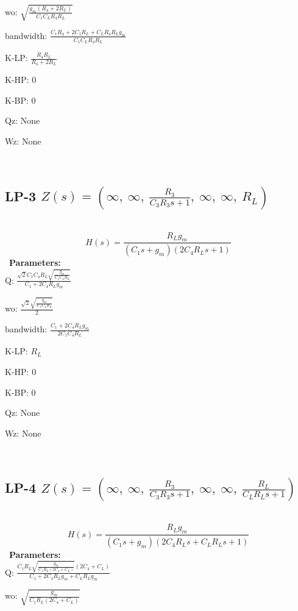 \documentclass{article}
\begin{document}
wo: $\sqrt{\frac{g_{m} \left(R_{4} + 2 R_{L}\right)}{C_{1} C_{L} R_{4} R_{L}}}$\ 

bandwidth: $\frac{C_{1} R_{4} + 2 C_{1} R_{L} + C_{L} R_{4} R_{L} g_{m}}{C_{1} C_{L} R_{4} R_{L}}$\ 

K-LP: $\frac{R_{4} R_{L}}{R_{4} + 2 R_{L}}$\ 

K-HP: $0$\ 

K-BP: $0$\ 

Qz: $\text{None}$\ 

Wz: $\text{None}$\ 

\ 

\subsection{LP-3 $Z(s) = \left( \infty, \  \infty, \  \frac{R_{3}}{C_{3} R_{3} s + 1}, \  \infty, \  \infty, \  R_{L}\right)$ } \ 
\textbf{\[H(s) = \frac{R_{L} g_{m}}{\left(C_{1} s + g_{m}\right) \left(2 C_{4} R_{L} s + 1\right)}\] } \ 
\textbf{Parameters:}\\ 

Q: $\frac{\sqrt{2} C_{1} C_{4} R_{L} \sqrt{\frac{g_{m}}{C_{1} C_{4} R_{L}}}}{C_{1} + 2 C_{4} R_{L} g_{m}}$\ 

wo: $\frac{\sqrt{2} \sqrt{\frac{g_{m}}{C_{1} C_{4} R_{L}}}}{2}$\ 

bandwidth: $\frac{C_{1} + 2 C_{4} R_{L} g_{m}}{2 C_{1} C_{4} R_{L}}$\ 

K-LP: $R_{L}$\ 

K-HP: $0$\ 

K-BP: $0$\ 

Qz: $\text{None}$\ 

Wz: $\text{None}$\ 

\ 

\subsection{LP-4 $Z(s) = \left( \infty, \  \infty, \  \frac{R_{3}}{C_{3} R_{3} s + 1}, \  \infty, \  \infty, \  \frac{R_{L}}{C_{L} R_{L} s + 1}\right)$ } \ 
\textbf{\[H(s) = \frac{R_{L} g_{m}}{\left(C_{1} s + g_{m}\right) \left(2 C_{4} R_{L} s + C_{L} R_{L} s + 1\right)}\] } \ 
\textbf{Parameters:}\\ 

Q: $\frac{C_{1} R_{L} \sqrt{\frac{g_{m}}{C_{1} R_{L} \left(2 C_{4} + C_{L}\right)}} \left(2 C_{4} + C_{L}\right)}{C_{1} + 2 C_{4} R_{L} g_{m} + C_{L} R_{L} g_{m}}$\ 

wo: $\sqrt{\frac{g_{m}}{C_{1} R_{L} \left(2 C_{4} + C_{L}\right)}}$\ 
\end{document}
